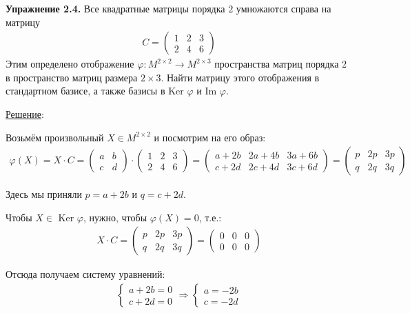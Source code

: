 \documentclass[a4paper, 12pt]{article}
\begin{document}
\begin{spacing}{1.5}
\textbf{Упражнение 2.4.} Все квадратные матрицы порядка $2$ умножаются справа на матрицу
\begin{align*}
C = 
\begin{pmatrix}
1 & 2 & 3 \\
2 & 4 & 6
\end{pmatrix}
\end{align*}
Этим определено отображение $\varphi: M^{2 \times 2} \rightarrow M^{2 \times 3}$ пространства матриц порядка $2$ в пространство матриц размера $2 \times 3$. Найти матрицу этого отображения в стандартном базисе, а также базисы в Ker $\varphi$ и Im $\varphi$.

\underline{Решение}:

\setlength{\leftskip}{5ex}
\setlength{\rightskip}{5ex}

Возьмём произвольный $X \in M^{2 \times 2}$ и посмотрим на его образ:
\begin{align*}
\varphi(X) = X \cdot C =
\begin{pmatrix}
a & b\\
c & d
\end{pmatrix}
\cdot
\begin{pmatrix}
1 & 2 & 3 \\
2 & 4 & 6
\end{pmatrix}
=
\begin{pmatrix}
a + 2b & 2a + 4b & 3a + 6b \\
c + 2d & 2c + 4d & 3c + 6d
\end{pmatrix}
=
\begin{pmatrix}
p & 2p & 3p \\
q & 2q & 3q
\end{pmatrix}
\end{align*}

Здесь мы приняли $p = a + 2b$ и $q = c + 2d$.

Чтобы $X \in$ Ker $\varphi$, нужно, чтобы $\varphi (X) = 0$, т.е.:
\begin{align*}
X \cdot C =
\begin{pmatrix}
p & 2p & 3p \\
q & 2q & 3q
\end{pmatrix}
=
\begin{pmatrix}
0 & 0 & 0 \\
0 & 0 & 0
\end{pmatrix}
\end{align*}

Отсюда получаем систему уравнений:
 \begin{align*}
 \begin{cases}
    a + 2b = 0 \\
    c + 2d = 0
\end{cases}
\Rightarrow
\begin{cases}
    a = -2b \\
    c = -2d
\end{cases}
\end{align*}


\end{spacing}
\end{document}
